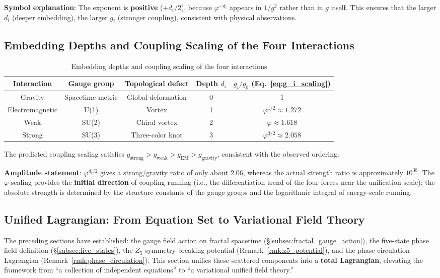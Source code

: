 \documentclass[12pt,a4paper,twocolumn]{article}
\renewcommand{\phi}{\varphi}
\begin{document}
\noindent\textbf{Symbol explanation}: The exponent is \textbf{positive} ($+d_i/2$), because $\phi^{-d_i}$ appears in $1/g^2$ rather than in $g$ itself. This ensures that the larger $d_i$ (deeper embedding), the larger $g_i$ (stronger coupling), consistent with physical observations.

\subsection{Embedding Depths and Coupling Scaling of the Four Interactions}

\begin{table}[H]
\centering
\footnotesize
\caption{Embedding depths and coupling scaling of the four interactions}
\begin{tabular}{c|c|c|c|c}
\hline
\textbf{Interaction} & \textbf{Gauge group} & \textbf{Topological defect} & \textbf{Depth} $d_i$ & \textbf{$g_i/g_0$ (Eq.~\ref{eq:g_i_scaling})} \\
\hline
Gravity & Spacetime metric & Global deformation & 0 & $1$ \\
Electromagnetic & U(1) & Vortex & 1 & $\phi^{1/2}\approx1.272$ \\
Weak & SU(2) & Chiral vortex & 2 & $\phi\approx1.618$ \\
Strong & SU(3) & Three-color knot & 3 & $\phi^{3/2}\approx2.058$ \\
\hline
\end{tabular}
\end{table}

The predicted coupling scaling satisfies $g_{\text{strong}} > g_{\text{weak}} > g_{\text{EM}} > g_{\text{gravity}}$, consistent with the observed ordering.

\textbf{Amplitude statement}: $\phi^{d_i/2}$ gives a strong/gravity ratio of only about $2.06$, whereas the actual strength ratio is approximately $10^{38}$. The $\phi$-scaling provides the \textbf{initial direction} of coupling running (i.e., the differentiation trend of the four forces near the unification scale); the absolute strength is determined by the structure constants of the gauge groups and the logarithmic integral of energy-scale running.

\subsection{Unified Lagrangian: From Equation Set to Variational Field Theory}
\label{subsec:total_lagrangian}

The preceding sections have established: the gauge field action on fractal spacetime (\S\ref{subsec:fractal_gauge_action}), the five-state phase field definition (\S\ref{subsec:five_states}), the $Z_5$ symmetry-breaking potential (Remark~\ref{rmk:z5_potential}), and the phase circulation Lagrangian (Remark~\ref{rmk:phase_circulation}). This section unifies these scattered components into a \textbf{total Lagrangian}, elevating the framework from ``a collection of independent equations'' to ``a variational unified field theory.''
\end{document}

